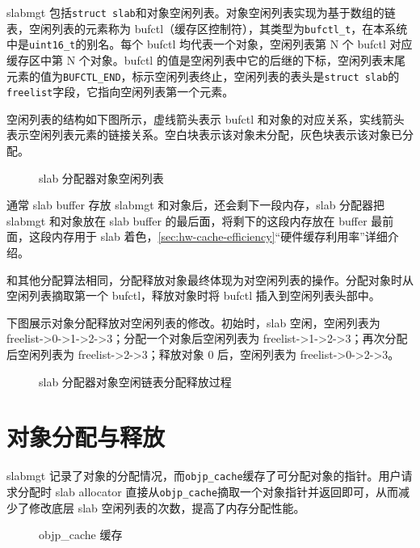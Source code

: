 \documentclass[AutoFakeBold]{LZUThesis}
\begin{document}
\begin{sloppypar}
slabmgt
包括\texttt{struct\ slab}和对象空闲列表。对象空闲列表实现为基于数组的链表，空闲列表的元素称为
bufctl（缓存区控制符），其类型为\texttt{bufctl\_t}，在本系统中是\texttt{uint16\_t}的别名。每个
bufctl 均代表一个对象，空闲列表第 N 个 bufctl 对应缓存区中第 N
个对象。bufctl
的值是空闲列表中它的后继的下标，空闲列表末尾元素的值为\texttt{BUFCTL\_END}，标示空闲列表终止，空闲列表的表头是\texttt{struct\ slab}的\texttt{freelist}字段，它指向空闲列表第一个元素。

空闲列表的结构如下图所示，虚线箭头表示 bufctl
和对象的对应关系，实线箭头表示空闲列表元素的链接关系。空白块表示该对象未分配，灰色块表示该对象已分配。

\begin{figure}
\centering

\caption{slab 分配器对象空闲列表}
\end{figure}

通常 slab buffer 存放 slabmgt 和对象后，还会剩下一段内存，slab 分配器把
slabmgt 和对象放在 slab buffer 的最后面，将剩下的这段内存放在 buffer
最前面，这段内存用于 slab 着色，\ref{sec:hw-cache-efficiency}“硬件缓存利用率”详细介绍。

和其他分配算法相同，分配释放对象最终体现为对空闲列表的操作。分配对象时从空闲列表摘取第一个
bufctl，释放对象时将 bufctl 插入到空闲列表头部中。

下图展示对象分配释放对空闲列表的修改。初始时，slab 空闲，空闲列表为
freelist-\textgreater0-\textgreater1-\textgreater2-\textgreater3；分配一个对象后空闲列表为
freelist-\textgreater1-\textgreater2-\textgreater3；再次分配后空闲列表为
freelist-\textgreater2-\textgreater3；释放对象 0 后，空闲列表为
freelist-\textgreater0-\textgreater2-\textgreater3。

\begin{figure}
\centering

\caption{slab 分配器对象空闲链表分配释放过程}
\end{figure}


\section{对象分配与释放}

slabmgt
记录了对象的分配情况，而\texttt{objp\_cache}缓存了可分配对象的指针。用户请求分配时
slab allocator
直接从\texttt{objp\_cache}摘取一个对象指针并返回即可，从而减少了修改底层
slab 空闲列表的次数，提高了内存分配性能。

\begin{figure}
\centering

\caption{objp\_cache 缓存}
\end{figure}


\end{sloppypar}
\end{document}
